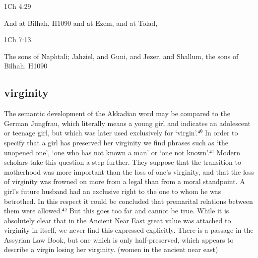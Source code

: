 \documentclass[11pt]{article}
\begin{document}
1Ch 4:29

And at Bilhah, H1090 and at Ezem, and at Tolad,


1Ch 7:13

The sons of Naphtali; Jahziel, and Guni, and Jezer, and Shallum, the sons of Bilhah. H1090

\subsection{virginity}

The semantic development of the Akkadian word may be compared to the German Jungfrau, which literally means a young girl and indicates an adolescent or teenage girl, but which
was later used exclusively for ‘virgin’.⁴⁰ In order to specify that a girl has preserved her virginity we find phrases such as ‘the unopened one’, ‘one who has not
known a man’ or ‘one not known’.⁴¹
Modern scholars take this question a step further. They suppose that the transition to motherhood was more important than the loss of one’s virginity, and
that the loss of virginity was frowned on more from a legal than from a moral
standpoint. A girl’s future husband had an exclusive right to the one to whom
he was betrothed. In this respect it could be concluded that premarital relations
between them were allowed.⁴² But this goes too far and cannot be true. While
it is absolutely clear that in the Ancient Near East great value was attached to
virginity in itself, we never find this expressed explicitly. There is a passage in
the Assyrian Law Book, but one which is only half-preserved, which appears to
describe a virgin losing her virginity.
(women in the ancient near east)
\end{document}
